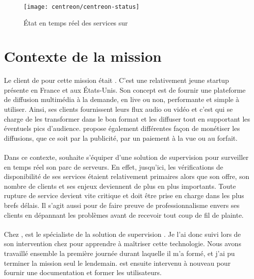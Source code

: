 \begin{figure}
	\centering
	\texttt{[image: centreon/centreon-status]}
	\caption{État en temps réel des services sur \acentreon{}}
	\label{figure:centreon:centreon}
\end{figure}


\section{Contexte de la mission}

\paragraph{}
Le client de \asmile{} pour cette mission était \adacast.
C'est une relativement jeune startup présente en France et aux États-Unis.
Son concept est de fournir une plateforme de diffusion multimédia à la demande, en live ou non, performante et simple à utiliser.
Ainsi, ses clients fournissent leurs flux audio ou vidéo et c'est \adacast{} qui se charge de les transformer dans le bon format et les diffuser tout en supportant les éventuels pics d'audience.
\adacast{} propose également différentes façon de monétiser les diffusions, que ce soit par la publicité, par un paiement à la vue ou au forfait.

\paragraph{}
Dans ce contexte, \adacast{} souhaite s'équiper d'une solution de supervision pour surveiller en temps réel son parc de serveurs.
En effet, jusqu'ici, les vérifications de disponibilité de ses services étaient relativement primaires alors que son offre, son nombre de clients et ses enjeux deviennent de plus en plus importants.
Toute rupture de service devient vite critique et doit être prise en charge dans les plus brefs délais.
Il s'agit aussi pour \adacast{} de faire preuve de professionnalisme envers ses clients en dépannant les problèmes avant de recevoir tout coup de fil de plainte.

\paragraph{}
Chez \asmile{}, \asegir{} est le spécialiste de la solution de supervision \acentreon{}.
Je l'ai donc suivi lors de son intervention chez \adacast{} pour apprendre à maîtriser cette technologie.
Nous avons travaillé ensemble la première journée durant laquelle il m'a formé, et j'ai pu terminer la mission seul le lendemain.
\asegir{} est ensuite intervenu à nouveau pour fournir une documentation et former les utilisateurs.


